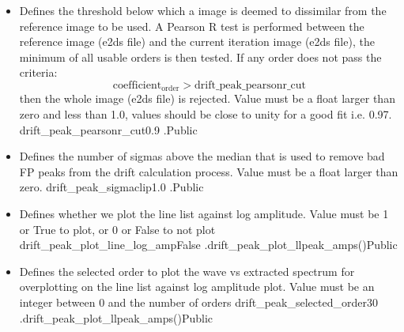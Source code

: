 \begin{itemize}
\item {}
{Defines the threshold below which a image is deemed to dissimilar from the reference image to be used. A Pearson R test is performed between the reference image (e2ds file) and the current iteration image (e2ds file), the minimum of all usable orders is then tested. If any order does not pass the criteria:
\begin{equation}
\text{coefficient}_{\text{order}} > \text{drift\_peak\_pearsonr\_cut}
\end{equation}
then the whole image (e2ds file) is rejected. Value must be a float larger than zero and less than 1.0, values should be close to unity for a good fit i.e. 0.97.
}
{drift\_peak\_pearsonr\_cut}{0.9}
{\calDRIFTPEAK}{\constantsfile}{\calDRIFTPEAK.\progMAIN}{Public}

\item {}
{Defines the number of sigmas above the median that is used to remove bad FP peaks from the drift calculation process. Value must be a float larger than zero.}
{drift\_peak\_sigmaclip}{1.0}
{\calDRIFTPEAK}{\constantsfile}{\calDRIFTPEAK.\progMAIN}{Public}


\item {}
{Defines whether we plot the line list against log amplitude. Value must be 1 or True to plot, or 0 or False to not plot}
{drift\_peak\_plot\_line\_log\_amp}{False}
{\calDRIFTPEAK}{\constantsfile}{\spirouPlot.drift\_peak\_plot{\hskip 0pt}\_llpeak\_amps()}{Public}

\item {}
{Defines the selected order to plot the wave vs extracted spectrum for overplotting on the line list against log amplitude plot. Value must be an integer between 0 and the number of orders}
{drift\_peak\_selected\_order}{30}
{\calDRIFTPEAK}{\constantsfile}{\spirouPlot.drift\_peak\_plot{\hskip 0pt}\_llpeak\_amps()}{Public}



\end{itemize}





